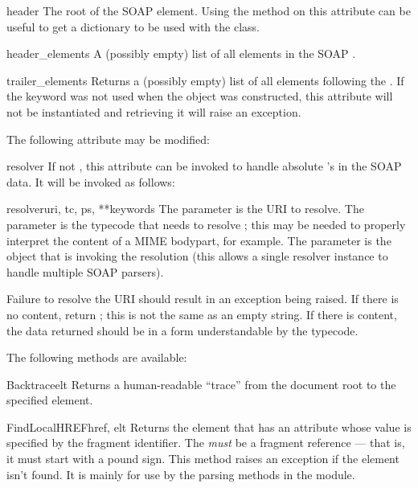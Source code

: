 \begin{memberdesc}{header}
The root of the SOAP  element.
Using the  method on this attribute can be useful
to get a dictionary to be used with the  class.
\end{memberdesc}

\begin{memberdesc}{header_elements}
A (possibly empty) list of all elements in the SOAP .
\end{memberdesc}

\begin{memberdesc}{trailer_elements}
Returns a (possibly empty) list of all elements following the .
If the  keyword was not used when the object was
constructed, this attribute will not be instantiated and retrieving
it will raise an exception.
\end{memberdesc}

The following attribute may be modified:

\begin{memberdesc}{resolver}
If not ,
this attribute can be invoked to handle absolute 's in the SOAP data.
It will be invoked as follows:

\begin{methoddesc}{resolver}{uri, tc, ps, **keywords}
The  parameter is the URI to resolve.
The  parameter is the typecode that needs to resolve ; this
may be needed to properly interpret the content of a MIME bodypart, for example.
The  parameter is the  object that is invoking
the resolution (this allows a single resolver instance to handle multiple
SOAP parsers).

Failure to resolve the URI should result in an exception being raised.
If there is no content, return ; this is not the same as an
empty string.
If there is content, the data returned should be in a form understandable
by the typecode.
\end{methoddesc}
\end{memberdesc}

The following methods are available:

\begin{methoddesc}{Backtrace}{elt}
Returns a human-readable ``trace'' from the document root to the
specified element.
\end{methoddesc}

\begin{methoddesc}{FindLocalHREF}{href, elt}
Returns the element that has an  attribute whose value is specified
by the  fragment identifier.
The  \emph{must} be a fragment reference --- that is, it must
start with a pound sign.
This method raises an  exception if the
element isn't found.
It is mainly for use by the parsing methods in the  module.
\end{methoddesc}

